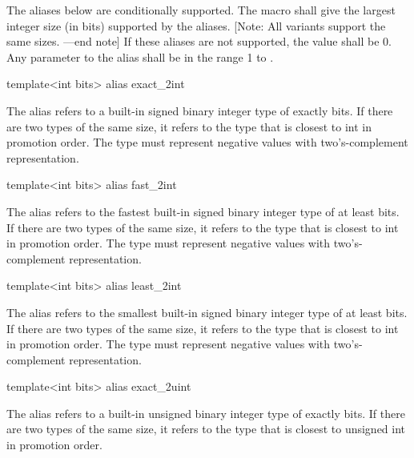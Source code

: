 \begin{addedblock}
The aliases below are conditionally supported. The macro  shall give the largest integer size (in bits) supported by the aliases. [Note: All variants support the same sizes. —end note] If these aliases are not supported, the value shall be 0. Any parameter to the alias shall be in the range 1 to .

\begin{itemdecl}
template<int bits> alias exact_2int    
\end{itemdecl}

\begin{itemdescr}
The alias  refers to a built-in signed binary integer type of exactly  bits. If there are two types of the same size, it refers to the type that is closest to int in promotion order. The type must represent negative values with two's-complement representation.    
\end{itemdescr}

\begin{itemdecl}
template<int bits> alias fast_2int    
\end{itemdecl}

\begin{itemdescr}
The alias  refers to the fastest built-in signed binary integer type of at least  bits. If there are two types of the same size, it refers to the type that is closest to int in promotion order. The type must represent negative values with two's-complement representation.    
\end{itemdescr} 

\begin{itemdecl}
template<int bits> alias least_2int    
\end{itemdecl}

\begin{itemdescr}
The alias  refers to the smallest built-in signed binary integer type of at least  bits. If there are two types of the same size, it refers to the type that is closest to int in promotion order. The type must represent negative values with two's-complement representation.    
\end{itemdescr} 

\begin{itemdecl}
template<int bits> alias exact_2uint    
\end{itemdecl}

\begin{itemdescr}
The alias  refers to a built-in unsigned binary integer type of exactly  bits. If there are two types of the same size, it refers to the type that is closest to unsigned int in promotion order.    
\end{itemdescr} 


\end{addedblock}
